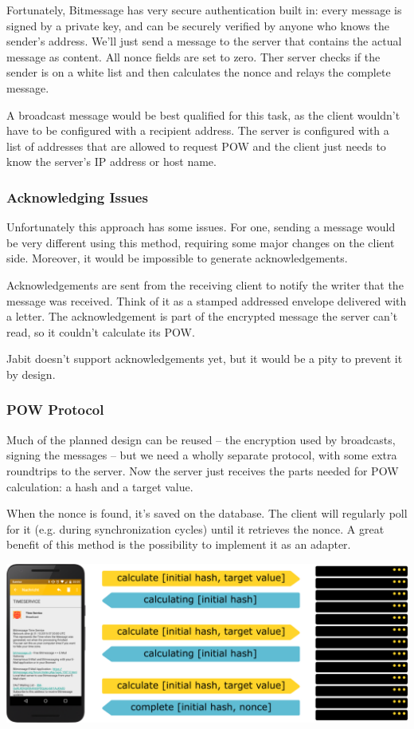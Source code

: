 \documentclass{bfh}
\begin{document}
  Fortunately, Bitmessage has very secure authentication built in: every message is signed by a private key, and can be securely verified by anyone who knows the sender's address. We'll just send a message to the server that contains the actual message as content. All nonce fields are set to zero. Ther server checks if the sender is on a white list and then calculates the nonce and relays the complete message.

  A broadcast message would be best qualified for this task, as the client wouldn't have to be configured with a recipient address. The server is configured with a list of addresses that are allowed to request \ac{POW} and the client just needs to know the server's IP address or host name.

  \subsubsection{Acknowledging Issues}
  Unfortunately this approach has some issues. For one, sending a message would be very different using this method, requiring some major changes on the client side. Moreover, it would be impossible to generate acknowledgements.

  Acknowledgements are sent from the receiving client to notify the writer that the message was received. Think of it as a stamped addressed envelope delivered with a letter. The acknowledgement is part of the encrypted message the server can't read, so it couldn't calculate its \ac{POW}.

  Jabit doesn't support acknowledgements yet, but it would be a pity to prevent it by design.

  \subsubsection{\ac{POW} Protocol}
  Much of the planned design can be reused -- the encryption used by broadcasts, signing the messages -- but we need a wholly separate protocol, with some extra roundtrips to the server. Now the server just receives the parts needed for \ac{POW} calculation: a hash and a target value.

  When the nonce is found, it's saved on the database. The client will regularly poll for it (e.g. during synchronization cycles) until it retrieves the nonce. A great benefit of this method is the possibility to implement it as an adapter.

  \includegraphics[width=\textwidth]{images/server_pow_protocol.pdf}
\end{document}
